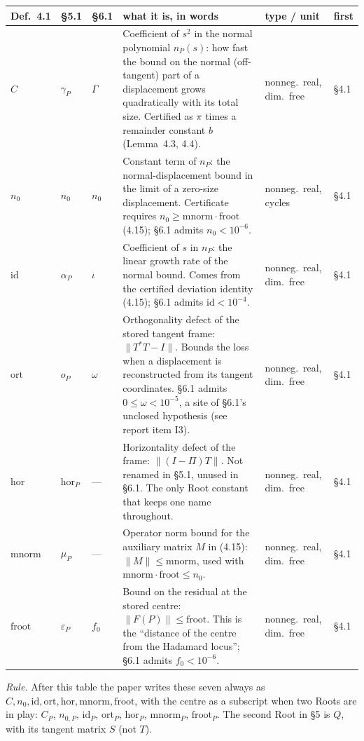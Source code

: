 \documentclass[11pt]{article}
\begin{document}
\begin{longtable}{@{}L{1.05cm}L{1.15cm}L{1.2cm}L{4.9cm}L{1.9cm}L{0.9cm}@{}}
\hline
Def.~4.1 & \S5.1 & \S6.1 & what it is, in words & type / unit & first \\
\hline
\endhead
$C$ & $\gamma_P$ & $\Gamma$ &
Coefficient of $s^2$ in the normal polynomial $n_P(s)$: how fast the bound on the
normal (off-tangent) part of a displacement grows quadratically with its total size. Certified as
$\pi$ times a remainder constant $b$ (Lemma~4.3, 4.4). &
nonneg.\ real, dim.\ free & \S4.1 \\
$n_0$ & $n_0$ & $n_0$ &
Constant term of $n_P$: the normal-displacement bound in the limit of a zero-size displacement.
Certificate requires $n_0 \ge \mathrm{mnorm}\cdot\mathrm{froot}$ (4.15); \S6.1 admits $n_0<10^{-6}$. &
nonneg.\ real, cycles & \S4.1 \\
$\mathrm{id}$ & $\alpha_P$ & $\iota$ &
Coefficient of $s$ in $n_P$: the linear growth rate of the normal bound. Comes from the certified
deviation identity (4.15); \S6.1 admits $\mathrm{id}<10^{-4}$. &
nonneg.\ real, dim.\ free & \S4.1 \\
$\mathrm{ort}$ & $o_P$ & $\omega$ &
Orthogonality defect of the stored tangent frame: $\|T^*T-I\|$. Bounds the loss when a displacement is
reconstructed from its tangent coordinates. \S6.1 admits $0\le\omega<10^{-5}$, a site of \S6.1's
unclosed hypothesis (see report item I3). &
nonneg.\ real, dim.\ free & \S4.1 \\
$\mathrm{hor}$ & $\mathrm{hor}_P$ & --- &
Horizontality defect of the frame: $\|(I-\Pi)T\|$. Not renamed in \S5.1, unused in \S6.1.
The only Root constant that keeps one name throughout. &
nonneg.\ real, dim.\ free & \S4.1 \\
$\mathrm{mnorm}$ & $\mu_P$ & --- &
Operator norm bound for the auxiliary matrix $M$ in (4.15): $\|M\|\le\mathrm{mnorm}$, used with
$\mathrm{mnorm}\cdot\mathrm{froot}\le n_0$. &
nonneg.\ real, dim.\ free & \S4.1 \\
$\mathrm{froot}$ & $\varepsilon_P$ & $f_0$ &
Bound on the residual at the stored centre: $\|F(P)\|\le\mathrm{froot}$. This is the
``distance of the centre from the Hadamard locus''; \S6.1 admits $f_0<10^{-6}$. &
nonneg.\ real, dim.\ free & \S4.1 \\
\hline
\end{longtable}

\noindent\emph{Rule.} After this table the paper writes these seven always as
$C,n_0,\mathrm{id},\mathrm{ort},\mathrm{hor},\mathrm{mnorm},\mathrm{froot}$, with the centre as a
subscript when two Roots are in play: $C_P$, $n_{0,P}$, $\mathrm{id}_P$, $\mathrm{ort}_P$,
$\mathrm{hor}_P$, $\mathrm{mnorm}_P$, $\mathrm{froot}_P$. The second Root in \S5 is $Q$, with its
tangent matrix $S$ (not $T$).
\end{document}
